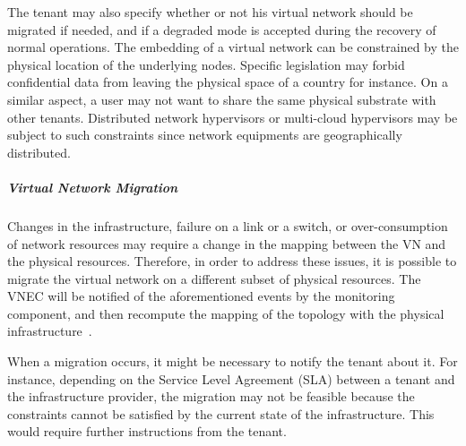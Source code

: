 The tenant may also specify whether or not his virtual network should be migrated if needed, and if a degraded mode is accepted during the recovery of normal operations.
The embedding of a virtual network can be constrained by the physical location of the underlying nodes.
Specific legislation may forbid confidential data from leaving the physical space of a country for instance.
On a similar aspect, a user may not want to share the same physical substrate with other tenants.
Distributed network hypervisors or multi-cloud hypervisors may be subject to such constraints since network equipments are geographically distributed.



\subparagraph{Virtual Network Migration}
Changes in the infrastructure, failure on a link or a switch, or over-consumption of network resources may require a change in the mapping between the VN and the physical resources.
Therefore, in order to address these issues, it is possible to migrate the virtual network on a different subset of physical resources. 
The VNEC will be notified of the aforementioned events by the monitoring component, and then recompute the mapping of the topology with the physical infrastructure~\cite{VeRTIGO-Corin2012a,AutoSlice-Bozakov2012,CoVisor-Jin2015}.

When a migration occurs, it might be necessary to notify the tenant about it.
For instance, depending on the Service Level Agreement (SLA) between a tenant and the infrastructure provider, the migration may not be feasible because the constraints cannot be satisfied by the current state of the infrastructure. This would require further instructions from the tenant.


